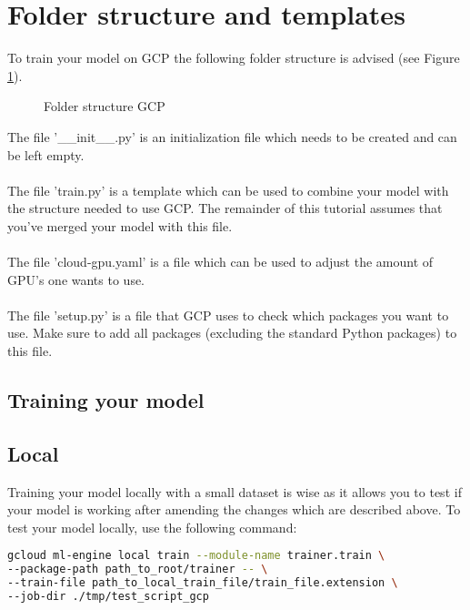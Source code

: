 \documentclass{article}
\begin{document}
\section{Folder structure and templates}
To train your model on GCP the following folder structure is advised (see Figure \ref{fig:fsgcp}).
\begin{figure}[H]
\caption{Folder structure GCP}
\label{fig:fsgcp}
\end{figure}
The file '\_\_init\_\_.py' is an initialization file which needs to be created and can be left empty.
\\
\\
The file 'train.py' is a template which can be used to combine your model with the structure needed to use GCP. The remainder of this tutorial assumes that you've merged your model with this file.
\\
\\
The file 'cloud-gpu.yaml' is a file which can be used to adjust the amount of GPU's one wants to use. 
\\
\\
The file 'setup.py' is a file that GCP uses to check which packages you want to use. Make sure to add all packages (excluding the standard Python packages) to this file.

\subsection{Training your model}
\subsection{Local}
Training your model locally with a small dataset is wise as it allows you to test if your model is working after amending the changes which are described above. To test your model locally, use the following command:

\begin{lstlisting}[language=Bash]
gcloud ml-engine local train --module-name trainer.train \ 
--package-path path_to_root/trainer -- \
--train-file path_to_local_train_file/train_file.extension \
--job-dir ./tmp/test_script_gcp
\end{lstlisting}
\end{document}
